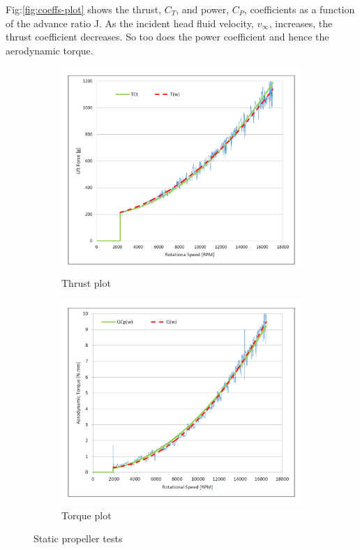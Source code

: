 Fig:\ref{fig:coeffs-plot} shows the thrust, {\color{Blue}$C_{T}$}, and power, {\color{Red}$C_{P}$}, coefficients as a function of the advance ratio J. As the incident head fluid velocity, $v_\infty$, increases, the thrust coefficient decreases. So too does the power coefficient and hence the aerodynamic torque. 
\begin{figure}[htbp]
\begin{subfigure}{0.5\textwidth}
\centering
\includegraphics[width=\textwidth]{graphs/thrust-plot}
\caption{Thrust plot}
\label{fig:thrust-plot}
\end{subfigure}
\begin{subfigure}{0.5\textwidth}
\centering
\includegraphics[width=\textwidth]{graphs/torque-plot}
\caption{Torque plot}
\label{fig:torque-plot}
\end{subfigure}
\caption{Static propeller tests}
\label{fig:propeller-plots}
\end{figure}
